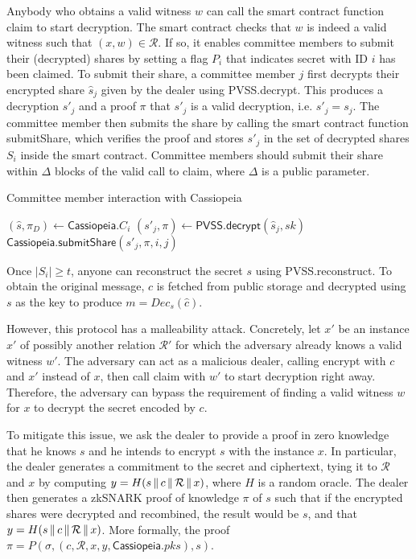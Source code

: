 Anybody who obtains a valid witness $w$ can call the smart contract function \textsf{claim} to start decryption.
The smart contract checks that $w$ is indeed a valid witness such that $(x, w) \in \mathcal{R}$.
If so, it enables committee members to submit their (decrypted) shares by setting a flag $P_i$ that indicates secret with ID $i$ has been claimed.
To submit their share, a committee member $j$ first decrypts their encrypted share $\hat{s}_j$ given by the dealer using \textsf{PVSS.decrypt}.
This produces a decryption $s'_j$ and a proof $\pi$ that $s'_j$ is a valid decryption, i.e. $s'_j = s_j$.
The committee member then submits the share by calling the smart contract function \textsf{submitShare}, which verifies the proof and stores $s'_j$ in the set of decrypted shares $S_i$ inside the smart contract.
Committee members should submit their share within $\Delta$ blocks of the valid call to \textsf{claim}, where $\Delta$ is a public parameter.

\begin{algorithm}[H]
    \caption{Committee member interaction with Cassiopeia}
\label{committee_member_alg_no_incentives}
    \begin{algorithmic}[1]
            \State $(\hat{s}, \pi_D) \gets \textsf{Cassiopeia}.C_i$
            \State $(s'_j, \pi) \gets \textsf{PVSS.decrypt}(\hat{s}_j, sk)$
            \State $\textsf{Cassiopeia.submitShare}(s'_j, \pi, i, j)$
        \EndOn
    \end{algorithmic}
\end{algorithm}

Once $|S_i| \geq t$, anyone can reconstruct the secret $s$ using \textsf{PVSS.reconstruct}.
To obtain the original message, $\hat{c}$ is fetched from public storage and decrypted using $s$ as the key to produce $m = Dec_s(\hat{c})$.

However, this protocol has a malleability attack.
Concretely, let $x'$ be an instance $x'$ of possibly another relation $\mathcal{R}'$ for which the adversary already knows a valid witness $w'$.
The adversary can act as a malicious dealer, calling \textsf{encrypt} with $c$ and $x'$ instead of $x$, then call \textsf{claim} with $w'$ to start decryption right away.
Therefore, the adversary can bypass the requirement of finding a valid witness $w$ for $x$ to decrypt the secret encoded by $c$.

To mitigate this issue, we ask the dealer to provide a proof in zero knowledge that he knows $s$ and he intends to encrypt $s$ with the instance $x$.
In particular, the dealer generates a commitment to the secret and ciphertext, tying it to $\mathcal{R}$ and $x$ by computing $y = H(s \,\|\, c \,\|\, \mathcal{R} \,\|\, x)$, where $H$ is a random oracle.
The dealer then generates a zkSNARK proof of knowledge $\pi$ of $s$ such that if the encrypted shares were decrypted and recombined, the result would be $s$, and that $y = H(s \,\|\, c \,\|\, \mathcal{R} \,\|\, x)$.
More formally, the proof $\pi = P(\sigma, (c, \mathcal{R}, x, y, \textsf{Cassiopeia}.pks), s)$.

